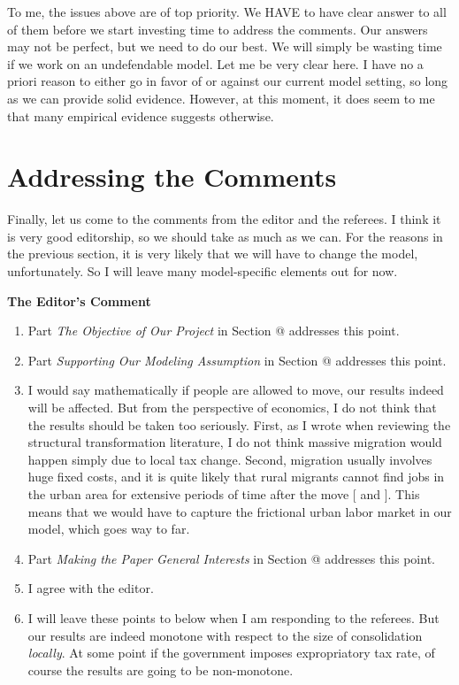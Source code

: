 \documentclass[twoside,11pt,leqno]{article}
\makeatletter
\newcommand*{\rom}[1]{\expandafter\@slowromancap\romannumeral #1@}
\makeatother
\begin{document}
To me, the issues above are of top priority. We HAVE to have clear answer to all of them before we start investing time to address the comments. Our answers may not be perfect, but we need to do our best. We will simply be wasting time if we work on an undefendable model. Let me be very clear here. I have no a priori reason to either go in favor of or against our current model setting, so long as we can provide solid evidence. However, at this moment, it does seem to me that many empirical evidence suggests otherwise.

\section{Addressing the Comments}

Finally, let us come to the comments from the editor and the referees. I think it is very good editorship, so we should take as much as we can. For the reasons in the previous section, it is very likely that we will have to change the model, unfortunately. So I will leave many model-specific elements out for now.

\begin{flushleft}
\textbf{The Editor's Comment}
\end{flushleft}
\begin{enumerate}
    \item
    Part \textit{The Objective of Our Project} in Section \rom{1} addresses this point.
    \item
    Part \textit{Supporting Our Modeling Assumption} in Section \rom{1} addresses this point.
    \item
    I would say mathematically if people are allowed to move, our results indeed will be affected. But from the perspective of economics, I do not think that the results should be taken too seriously. First, as I wrote when reviewing the structural transformation literature, I do not think massive migration would happen simply due to local tax change. Second, migration usually involves huge fixed costs, and it is quite likely that rural migrants cannot find jobs in the urban area for extensive periods of time after the move [\citet{Fengetal:2018} and \citet{Poschke:2018}]. This means that we would have to capture the frictional urban labor market in our model, which goes way to far.
    \item
    Part \textit{Making the Paper General Interests} in Section \rom{1} addresses this point.
    \item
    I agree with the editor.
    \item
    I will leave these points to below when I am responding to the referees. But our results are indeed monotone with respect to the size of consolidation \textit{locally}. At some point if the government imposes expropriatory tax rate, of course the results are going to be non-monotone.
\end{enumerate}
\end{document}
